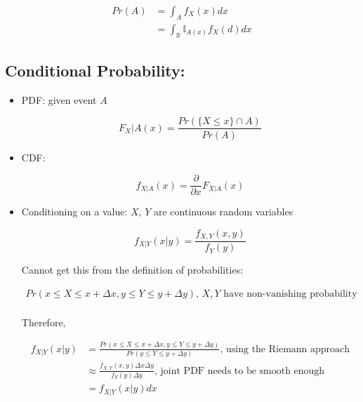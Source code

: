 \documentclass[11pt,letterpaper,titlepage]{article}
\begin{document}
\begin{equation*}
    \begin{aligned}
        Pr(A) &= \int_A f_X(x) dx \\
        &= \int_\mathbb{R} \mathbb{I}_{A(x)} f_X(d) dx
    \end{aligned}
\end{equation*}

\subsection{Conditional Probability:}

\begin{itemize}

    \item PDF: given event $A$
    
    \begin{equation*}
         F_X|A(x) =\frac{Pr(\{X \leq x\} \cap A)}{Pr(A)}
    \end{equation*}
    
    \item CDF:
    
    \begin{equation*}
        f_{X|A}(x) = \frac{\partial}{\partial x} F_{X|A}(x)
    \end{equation*}
    
    \item Conditioning on a value: $X$, $Y$ are continuous random variables
    
    \begin{equation*}
        f_{X|Y}(x|y) = \frac{f_{X, Y}(x, y)}{f_Y(y)}
    \end{equation*}
    
    Cannot get this from the definition of probabilities:
    
    
    \begin{equation*}
        \begin{aligned}
            Pr(x \leq X \leq x + \Delta x, y \leq Y \leq y + \Delta y) \text{, } X, Y \text{ have non-vanishing probability} \\
        \end{aligned}
    \end{equation*}
    
    Therefore,
    
    \begin{equation*}
        \begin{aligned}
            f_{X|Y}(x|y) &= \frac{Pr(x \leq X \leq x + \Delta x, y \leq Y \leq y + \Delta y)}{Pr(y \leq Y \leq y + \Delta y)} \text{, using the Riemann approach} \\
            &\approx \frac{f_{X, Y}(x, y) \Delta x \Delta y}{f_Y(y) \Delta y} \text{, joint PDF needs to be smooth enough} \\
            &= f_{X|Y}(x|y) dx
        \end{aligned}
    \end{equation*}
    

\end{itemize}
\end{document}
